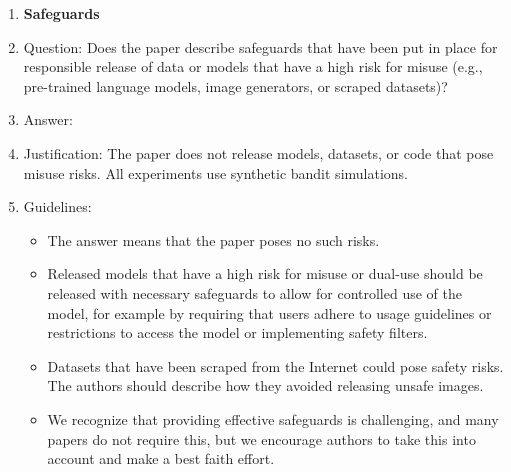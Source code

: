 \documentclass{article}
\begin{document}
\begin{enumerate}
\item {\bf Safeguards}
    \item[] Question: Does the paper describe safeguards that have been put in place for responsible release of data or models that have a high risk for misuse (e.g., pre-trained language models, image generators, or scraped datasets)?
    \item[] Answer: \answerNA{}
    \item[] Justification: The paper does not release models, datasets, or code that pose misuse risks. All experiments use synthetic bandit simulations.
    \item[] Guidelines:
    \begin{itemize}
        \item The answer \answerNA{} means that the paper poses no such risks.
        \item Released models that have a high risk for misuse or dual-use should be released with necessary safeguards to allow for controlled use of the model, for example by requiring that users adhere to usage guidelines or restrictions to access the model or implementing safety filters.
        \item Datasets that have been scraped from the Internet could pose safety risks. The authors should describe how they avoided releasing unsafe images.
        \item We recognize that providing effective safeguards is challenging, and many papers do not require this, but we encourage authors to take this into account and make a best faith effort.
    \end{itemize}


\end{enumerate}
\end{document}
